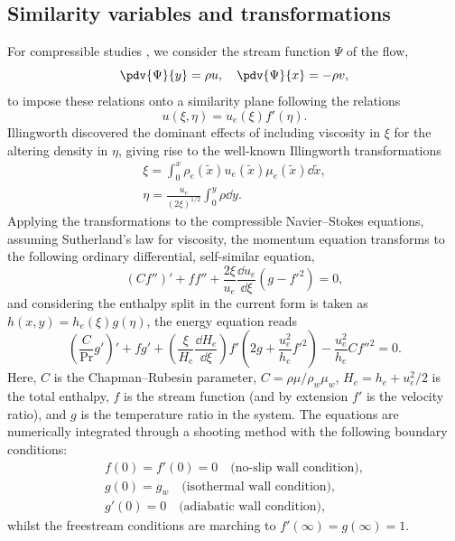 \subsection{Similarity variables and transformations}
For compressible studies \citep[p.~511]{White2005}, we consider the stream function $\Psi$ of the flow,
\begin{equation}
    \pdv{\Psi}{y} = \rho u, \quad \pdv{\Psi}{x} = -\rho v,
\end{equation}
to impose these relations onto a similarity plane following the relations
\begin{equation}
    u(\xi, \eta) = u_e(\xi) f'(\eta).
\end{equation}
Illingworth discovered the dominant effects of including viscosity in $\xi$ for the altering density in $\eta$, giving rise to the well-known Illingworth transformations
\begin{gather}
    \xi = \int^{x}_{0} \rho_e(\tilde{x}) u_e(\tilde{x}) \mu_e(\tilde{x}) \dd\tilde{x}, \\
    \eta = \frac{u_e}{(2\xi)^{1/2}} \int^{y}_{0} \rho \dd y.
\end{gather}
Applying the transformations to the compressible Navier--Stokes equations, assuming Sutherland's law for viscosity, the momentum equation transforms to the following ordinary differential, self-similar equation,
\begin{equation}
    (C f'')' + f f'' + \frac{2\xi}{u_e} \frac{\dd u_e}{\dd\xi} \left(g - f'^2\right) = 0,
\end{equation}
and considering the enthalpy split in the current form is taken as $h(x,y) = h_e(\xi) g(\eta)$, the energy equation reads
\begin{equation}
    \left(\frac{C}{\mathrm{Pr}} g'\right)' + f g' + \left(\frac{\xi}{H_e} \frac{\dd H_e}{\dd\xi}\right) f' \left(2g + \frac{u_{e}^2}{h_e} f'^{2}\right) - \frac{u_{e}^2}{h_e} C f''^2 = 0.
\end{equation}
Here, $C$ is the Chapman--Rubesin parameter, $C = \rho \mu / \rho_w \mu_w$, $H_e = h_e + u_e^2/2$ is the total enthalpy, $f$ is the stream function (and by extension $f'$ is the velocity ratio), and $g$ is the temperature ratio in the system. The equations are numerically integrated through a shooting method with the following boundary conditions:
\begin{gather}
    f(0) = f'(0) = 0 \quad \text{(no-slip wall condition)}, \\
    g(0) = g_w \quad \text{(isothermal wall condition)}, \\
    g'(0) = 0 \quad \text{(adiabatic wall condition)},
\end{gather}
whilst the freestream conditions are marching to $f'(\infty) = g(\infty) = 1$.


